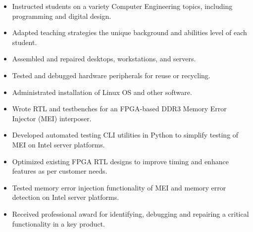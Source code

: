 \documentclass{article}
\begin{document}
\vspace{3pt}


	\begin{itemize}\setlength{\itemsep}{-4pt}
		\item Instructed students on a variety Computer Engineering topics, including programming and digital design.
		\item Adapted teaching strategies the unique background and abilities level of each student.
	\end{itemize}

	
	\begin{itemize} \setlength{\itemsep}{-4pt}
		\item Assembled and repaired desktops, workstations, and servers.
		\item Tested and debugged hardware peripherals for reuse or recycling.		
		\item Administrated installation of Linux OS and other software.
	\end{itemize}


	\begin{itemize}\setlength{\itemsep}{-4pt}
		\item Wrote RTL and testbenches for an FPGA-based DDR3 Memory Error Injector (MEI) interposer.
		\item Developed automated testing CLI utilities in Python to simplify testing of MEI on Intel server platforms.
		\item Optimized existing FPGA RTL designs to improve timing and enhance features as per customer needs.
		\item Tested memory error injection functionality of MEI and memory error detection on Intel server platforms.
		\item Received professional award for identifying, debugging and repairing a critical functionality in a key product.

	\end{itemize} 
	
	
\end{document}
